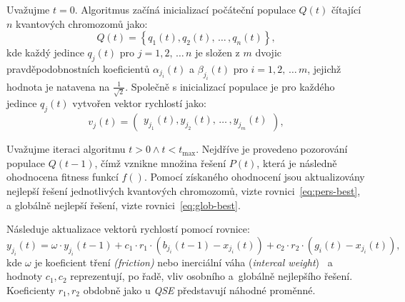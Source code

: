 Uvažujme $t=0$. Algoritmus začíná inicializací počáteční populace $Q\left(t\right)$ čítající $n$ kvantových chromozomů jako: 
\begin{equation*}
    Q\left(t\right) = \left\{q_1\left(t\right), q_2\left(t\right),\,\dots\,,q_n\left(t\right)\right\},
\end{equation*}
kde každý jedince $q_j\left(t\right)$ pro $j=1,2,\,\dots\,n$ je složen z $m$ dvojic pravděpodobnostních koeficientů $\alpha_{j_i}\left(t\right)$ a $\beta_{j_i}\left(t\right)$ pro $i=1,2,\,\dots\,m$, jejichž hodnota je natavena na $\frac{1}{\sqrt{2}}$.
Společně s inicializací populace je pro každého jedince $q_j\left(t\right)$ vytvořen vektor rychlostí jako:
\begin{equation*}
    v_j\left(t\right) = \begin{pmatrix} y_{j_1}\left(t\right), y_{j_2}\left(t\right),\,\dots\,, y_{j_m}\left(t\right) \end{pmatrix},
\end{equation*}

Uvažujme iteraci algoritmu $t>0 \wedge t<t_{\text{max}}$. 
Nejdříve je provedeno pozorování populace $Q\left(t-1\right)$, čímž vznikne množina řešení $P\left(t\right)$, která je následně ohodnocena fitness funkcí $f\left(\right)$. 
Pomocí získaného ohodnocení jsou aktualizovány nejlepší řešení jednotlivých kvantových chromozomů, vizte rovnici~\ref{eq:pers-best}, a globálně nejlepší řešení, vizte rovnici~\ref{eq:glob-best}. 

Následuje aktualizace vektorů rychlostí pomocí rovnice:
\begin{equation*}
    y_{j_i}\left(t\right) = \omega \cdot y_{j_i}\left(t-1\right) + c_1 \cdot r_1 \cdot (b_{j_i}\left(t-1\right) - x_{j_i}\left(t\right)) + c_2 \cdot r_2 \cdot (g_i\left(t\right) - x_{j_i}\left(t\right)),
\end{equation*}
kde $\omega$ je koeficient tření \emph{(friction)} nebo inerciální váha (\emph{intercal weight})~\cite{PSO-c1c2w} a hodnoty $c_1,c_2$ reprezentují, po řadě, vliv osobního a~globálně nejlepšího řešení. 
Koeficienty $r_1, r_2$ obdobně jako u \emph{QSE} představují náhodné proměnné. 

